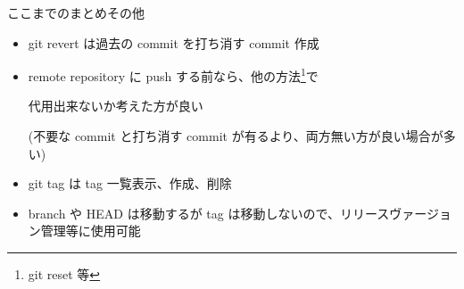 % 
% 
% 
% 

\begin{frame}[t]{ここまでのまとめ}{その他}

  \begin{itemize}
  \item git revert は過去の commit を打ち消す commit 作成
    \vspace{2ex}

  \item remote repository に push する前なら、他の方法\footnote{git reset 等}で

    代用出来ないか考えた方が良い

    (不要な commit と打ち消す commit が有るより、両方無い方が良い場合が多い)
    \vspace{2ex}

  \item git tag は tag 一覧表示、作成、削除
    \vspace{2ex}

  \item branch や HEAD は移動するが tag は移動しないので、リリースヴァージョン管理等に使用可能
  \end{itemize}

\end{frame}
